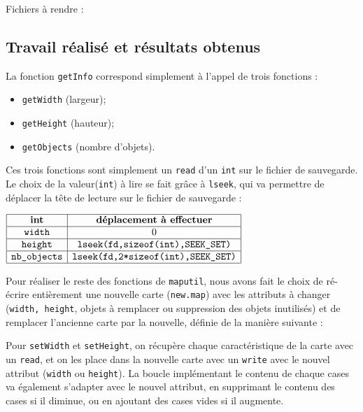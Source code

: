 \documentclass[a4paper, 12pt]{article}
\begin{document}
	Fichiers à rendre :
	
	\subsection{Travail réalisé et résultats obtenus}
	
	La fonction \texttt{getInfo} correspond simplement à l'appel de trois fonctions :
	\begin{itemize}
		\item \texttt{getWidth} (largeur);
		\item \texttt{getHeight} (hauteur);
		\item \texttt{getObjects} (nombre d'objets).
	\end{itemize}
	Ces trois fonctions sont simplement un \texttt{read} d'un \texttt{int} sur le fichier de sauvegarde. Le choix de la valeur(\texttt{int}) à lire se fait grâce à \texttt{lseek}, qui va permettre de déplacer la tête de lecture sur le fichier de sauvegarde : 
	
\begin{center} 

	$
	\begin{array}{|c|c|}
 	\hline \textbf{int} & \textbf{déplacement à effectuer} \\ 
 	\hline \texttt{width} & 0 \\ 
 	\hline \texttt{height} & \texttt{lseek(fd,sizeof(int),SEEK\_SET)} \\ 
 	\hline \texttt{nb\_objects} & \texttt{lseek(fd,2*sizeof(int),SEEK\_SET)} \\ 
 	\hline \end{array}
 	$ 

\end{center}

Pour réaliser le reste des fonctions de \texttt{maputil}, nous avons fait le choix de ré-écrire entièrement une nouvelle carte (\texttt{new.map}) avec les attributs à changer (\texttt{width, height}, objets à remplacer ou suppression des objets inutilisés) et de remplacer l'ancienne carte par la nouvelle, définie de la manière suivante : 

	 Pour \texttt{setWidth} et \texttt{setHeight}, on récupère chaque caractéristique de la	carte avec un \texttt{read}, et on les place dans la nouvelle carte avec un \texttt{write} avec le nouvel attribut (\texttt{width} ou \texttt{height}). La boucle implémentant le contenu de chaque cases va également s'adapter avec le nouvel attribut, en supprimant le contenu des cases si il diminue, ou en ajoutant des cases vides si il augmente. \\
	
\end{document}
